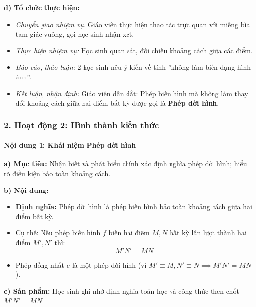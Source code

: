 \documentclass[12pt, a4paper]{article}
\begin{document}
\textbf{d) Tổ chức thực hiện:}
\begin{itemize}[leftmargin=0.6cm]
    \item \textit{Chuyển giao nhiệm vụ:} Giáo viên thực hiện thao tác trực quan với miếng bìa tam giác vuông, gọi học sinh nhận xét.
    \item \textit{Thực hiện nhiệm vụ:} Học sinh quan sát, đối chiếu khoảng cách giữa các điểm.
    \item \textit{Báo cáo, thảo luận:} 2 học sinh nêu ý kiến về tính ''không làm biến dạng hình ảnh''.
    \item \textit{Kết luận, nhận định:} Giáo viên dẫn dắt: Phép biến hình mà không làm thay đổi khoảng cách giữa hai điểm bất kỳ được gọi là \textbf{Phép dời hình}.
\end{itemize}

\subsubsection*{2. Hoạt động 2: Hình thành kiến thức}

\paragraph{Nội dung 1: Khái niệm Phép dời hình}
\textbf{a) Mục tiêu:} Nhận biết và phát biểu chính xác định nghĩa phép dời hình; hiểu rõ điều kiện bảo toàn khoảng cách.

\textbf{b) Nội dung:}
\begin{itemize}[leftmargin=0.6cm]
    \item \textbf{Định nghĩa:} Phép dời hình là phép biến hình bảo toàn khoảng cách giữa hai điểm bất kỳ.
    \item Cụ thể: Nếu phép biến hình $f$ biến hai điểm $M, N$ bất kỳ lần lượt thành hai điểm $M', N'$ thì:
    $$M'N' = MN$$
    \item Phép đồng nhất $e$ là một phép dời hình (vì $M' \equiv M, N' \equiv N \implies M'N' = MN$).
\end{itemize}

\textbf{c) Sản phẩm:} Học sinh ghi nhớ định nghĩa toán học và công thức then chốt $M'N' = MN$.
\end{document}
